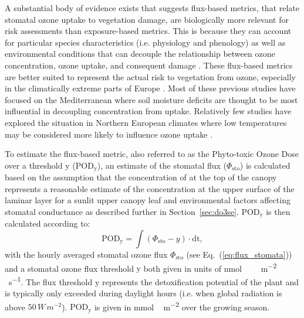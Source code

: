 \documentclass[bg, manuscript]{copernicus}
\begin{document}
A substantial body of evidence exists that suggests flux-based metrics, that relate stomatal ozone uptake to vegetation damage, are biologically more relevant for risk assessments than exposure-based metrics. This is because they can account for particular species characteristics (i.e. physiology and phenology) as well as environmental conditions that can decouple the relationship between ozone concentration, ozone uptake, and consequent damage \citep{PT:Emberson2020}. These flux-based metrics are better suited to represent the actual risk to vegetation from ozone, especially in the climatically extreme parts of Europe \citep{EP:Simpson2007,GCB:Mills2011,ICP:MappingManual2017}. Most of these previous studies have focused on the Mediterranean where soil moisture deficits are thought to be most influential in decoupling concentration from uptake. Relatively few studies have explored the situation in Northern European climates where low temperatures may be considered more likely to influence ozone uptake \citep[e.g.]{iF:Juran2018}.

To estimate the flux-based metric, also referred to as the Phyto-toxic Ozone Dose over a threshold y ($\mathrm{POD_y}$), an estimate of the stomatal  flux ($\Phi_\mathrm{sto}$) is calculated based on the assumption that the concentration of  at the top of the canopy represents a reasonable estimate of the concentration at the upper surface of the laminar layer for a sunlit upper canopy leaf and environmental factors affecting stomatal conductance as described further in Section~\ref{sec:do3se}. $\mathrm{POD_y}$ is then calculated according to:
%
\begin{equation}
  \mathrm{POD_y} = \int{(\Phi_\mathrm{sto}-y)\cdot \mathrm{dt}},
  \label{eq:pod}
\end{equation}
%
with the hourly averaged stomatal ozone flux $\Phi_\mathrm{sto}$ (see Eq.~(\ref{eq:flux_stomata})) and a stomatal ozone flux threshold $\mathrm{y}$ both given in units of \unit{nmol\,\,m^{-2}\,\,s^{-1}}. The flux threshold $\mathrm{y}$ represents the detoxification potential of the plant and is typically only exceeded during daylight hours (i.e. when global radiation is above $50\,\unit{W\,m^{-2}}$). $\mathrm{POD_y}$ is given in \unit{mmol\,m^{-2}} over the growing season.
\end{document}
